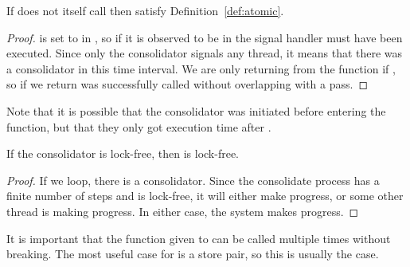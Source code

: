 \begin{theorem}
  If  does not itself call  then  satisfy
  Definition~\ref{def:atomic}.
\end{theorem}
\begin{proof}
   is set to  in , so if it is observed to be
   in  the signal handler must have been executed. Since only the consolidator
  signals any thread, it means that there was a consolidator in this time interval. We are only
  returning from the function if , so if we return  was
  successfully called without overlapping with a pass.
\end{proof}
Note that it is possible that the consolidator was initiated before entering the 
function, but that they only got execution time after .
\begin{lemma}
  If the consolidator is lock-free, then  is lock-free.
\end{lemma}
\begin{proof}
  If we loop, there is a consolidator. Since the consolidate process has a finite number of steps
  and is lock-free, it will either make progress, or some other thread is making progress. In
  either case, the system makes progress.
\end{proof}

It is important that the function given to  can be called multiple times without
breaking. The most useful case for  is a  store pair, so this is
usually the case.
